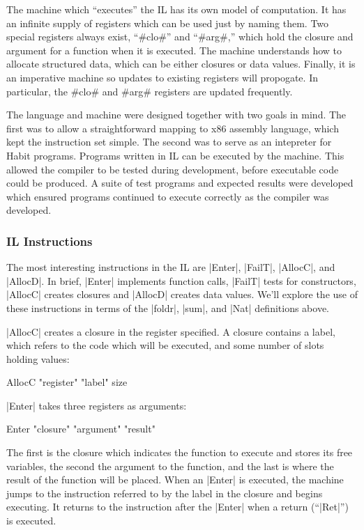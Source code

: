 \documentclass[11pt]{article}
\begin{document}
The machine which ``executes'' the IL has its own model
of computation. It has an infinite supply of registers which can be
used just by naming them. Two special registers always exist,
``#clo#'' and ``#arg#,'' which hold the closure and argument for a
function when it is executed. The machine understands how to allocate
structured data, which can be either closures or data values. Finally,
it is an imperative machine so updates to existing registers will
propogate. In particular, the #clo# and #arg# registers are updated
frequently.

The language and machine were designed together with two goals in
mind. The first was to allow a straightforward mapping to x86 assembly
language, which kept the instruction set simple. The second was to
serve as an intepreter for Habit programs. Programs written in IL can
be executed by the machine. This allowed the compiler to be tested
during development, before executable code could be produced. A suite
of test programs and expected results were developed which ensured
programs continued to execute correctly as the compiler was developed.

\subsubsection{IL Instructions}

The most interesting instructions in the IL are |Enter|, |FailT|,
|AllocC|, and |AllocD|. In brief, |Enter| implements function calls,
|FailT| tests for constructors, |AllocC| creates closures and |AllocD|
creates data values. We'll explore the use of these instructions in
terms of the |foldr|, |sum|, and |Nat| definitions above. 

|AllocC| creates a closure in the register specified. A closure
contains a label, which refers to  the code which will be executed, and
some number of slots holding values:

\begin{code}
AllocC "register" "label" size
\end{code}

\noindent
|Enter| takes three registers as arguments:

\begin{code}
Enter "closure" "argument" "result"
\end{code}

\noindent
The first is the closure which indicates the function to execute and
stores its free variables, the second the argument to the function,
and the last is where the result of the function will be placed. When
an |Enter| is executed, the machine jumps to the instruction referred
to by the label in the closure and begins executing. It returns to the
instruction after the |Enter| when a return (``|Ret|'') is executed.
\end{document}

